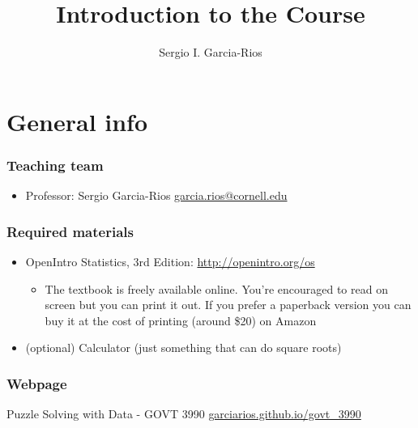 \documentclass[11pt]{beamer}
\author{Sergio I. Garcia-Rios}
\title{Introduction to the Course}
\institute{Government 3990: Statistics in the Social Science}
\date{}
\begin{document}
\maketitle


\section{General info}


\begin{frame}
\frametitle{Teaching team}

\begin{itemize}

\item Professor: Sergio Garcia-Rios \url{garcia.rios@cornell.edu}


\end{itemize}

\end{frame}


\begin{frame}
\frametitle{Required materials}

\begin{itemize}

\item OpenIntro Statistics, 3rd Edition: \url{http://openintro.org/os}

\begin{itemize}
\item The textbook is freely available online. You're encouraged to read on screen but you can print it out. If you prefer a paperback version you can buy it at the cost of printing (around \$20) on Amazon
\end{itemize}

\item (optional) Calculator (just something that can do square roots)

\end{itemize}

\end{frame}


\begin{frame}
\frametitle{Webpage}


\centering
{\Large Puzzle Solving with Data - GOVT 3990
\url{garciarios.github.io/govt_3990} 
}

\end{frame}
\end{document}
